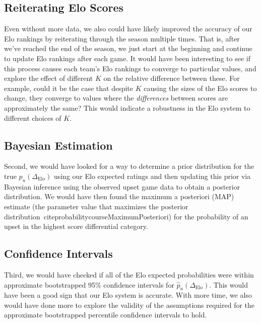 \documentclass{article}
\begin{document}
\subsection{Reiterating Elo Scores}
Even without more data, we also could have likely improved the accuracy of our Elo rankings by reiterating through the season multiple times. That is, after we've reached the end of the season, we just start at the beginning and continue to update Elo rankings after each game. It would have been interesting to see if this process causes each team's Elo rankings to converge to particular values, and explore the effect of different $K$ on the relative difference between these. For example, could it be the case that despite $K$ causing the sizes of the Elo scores to change, they converge to values where the \textit{differences} between scores are approximately the same? This would indicate a robustness in the Elo system to different choices of $K$.

\subsection{Bayesian Estimation}
Second, we would have looked for a way to determine a prior distribution for the true ${p}_u(\Delta_{\text{Elo}})$ using our Elo expected ratings and then updating this prior via Bayesian inference using the observed upset game data to obtain a posterior distribution. We would have then found the maximum a posteriori (MAP) estimate (the parameter value that maximizes the posterior distribution~cite{probabilitycourseMaximumPosteriori}) for the probability of an upset in the highest score differential category.

\subsection{Confidence Intervals}
Third, we would have checked if all of the Elo expected probabilities were within approximate bootstrapped 95\% confidence intervals for $\hat{p}_u(\Delta_{\text{Elo}})$. This would have been a good sign that our Elo system is accurate. With more time, we also would have done more to explore the validity of the assumptions required for the approximate bootstrapped percentile confidence intervals to hold.
\end{document}
